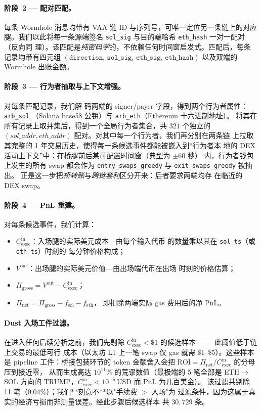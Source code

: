 \documentclass[11pt,a4paper]{ctexart}
\newcommand{\EthSol}{ETH$\to$SOL}
\newcommand{\Cexec}{C_{\text{exec}}}
\begin{document}
\paragraph{阶段~2 --- 配对匹配。} 每条 Wormhole 消息均带有 VAA 链 ID
与序列号，可唯一定位另一条链上的对应腿。我们以此将每一条源端签名
\texttt{sol\_sig} 与目的端哈希 \texttt{eth\_hash} 一对一配对（反向同
理）。该匹配是\emph{纯密码学}的，不依赖任何时间窗启发式。匹配后，每条
记录均带有四元组
$(\texttt{direction, sol\_sig, eth\_sig, eth\_hash})$ 以及双端的
Wormhole 出账金额。

\paragraph{阶段~3 --- 行为者抽取与上下文增强。} 对每条匹配记录，我们解
码两端的 signer/payer 字段，得到两个行为者属性：\texttt{arb\_sol}
（Solana base58 公钥）与 \texttt{arb\_eth}（Ethereum 十六进制地址）。
将其在所有记录上取并集后，得到一个全局行为者集合，共 $321$ 个独立的
$(sol\_addr, eth\_addr)$ 配对。对其中每一个行为者，我们再分别在两条链
上拉取其完整的 1 年交易历史，使得每一条候选事件都能被嵌入到“行为者本
地的 DEX 活动上下文”中：在桥腿前后某可配置时间窗（典型为 $\pm 60$ 秒）
内，行为者钱包上发生的所有 swap 都会作为
\texttt{entry\_swaps\_greedy} 与 \texttt{exit\_swaps\_greedy} 被抽出。
正是这一步把\emph{桥转账}与\emph{跨链套利}区分开来：后者要求两端均存
在临近的 DEX swap。

\paragraph{阶段~4 --- PnL 重建。} 对每条候选事件，我们计算：
\begin{itemize}
    \item $\Cexec^{\text{in}}$：入场腿的实际美元成本---由每个输入代币
        的数量乘以其在 \texttt{sol\_ts}（或 \texttt{eth\_ts}）时刻的
        每分钟价格构成；
    \item $V^{\text{out}}$：出场腿的实际美元价值---由出场端代币在出场
        时刻的价格估算；
    \item $\Pi_{\text{gross}} = V^{\text{out}} - \Cexec^{\text{in}}$；
    \item $\Pi_{\text{net}} = \Pi_{\text{gross}} - f_{\text{sol}} - f_{\text{eth}}$，
        即扣除两端实际 gas 费用后的净 PnL。
\end{itemize}
\paragraph{Dust 入场工件过滤。} 在进入任何后续分析之前，我们先剔除
$\Cexec^{\text{in}}<\$1$ 的候选样本 —— 此阈值低于链上交易的最低可行
成本（以太坊 L1 上一笔 swap 仅 gas 就需 \$1--\$5）。这些样本是
pipeline 工件：桥接包装环节的 token 金额舍入会把
$\mathrm{ROI}=\Pi_{\text{net}}/\Cexec^{\text{in}}$ 的分母压到接近零，
从而生成高达 $10^{11}\%$ 的荒谬数值（最极端的 5 笔全部是 \EthSol{}
方向的 TRUMP，$\Cexec^{\text{in}}<\!10^{-5}$\,USD 而 PnL 为几百美金）。
该过滤共剔除 11 笔（$0.04\%$）；我们**刻意不**以"手续费 $>$ 入场"为
过滤条件，因为这属于真实的经济亏损而非测量误差。经此步骤后候选样本
共 $30{,}729$ 条。
\end{document}
